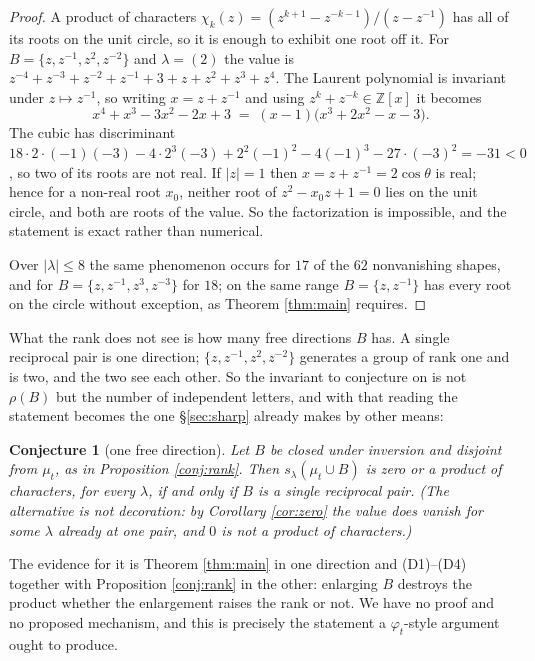 \documentclass[11pt,reqno]{amsart}
\theoremstyle{plain}
\newtheorem{conjecture}[theorem]{Conjecture}
\theoremstyle{definition}
\newcommand{\ZZ}{\mathbb{Z}}
\newcommand{\zt}{\mu_t}
\begin{document}
\begin{proof}
A product of characters $\chi_k(z)=(z^{k+1}-z^{-k-1})/(z-z^{-1})$ has all of its roots on the unit
circle, so it is enough to exhibit one root off it. For $B=\{z,z^{-1},z^{2},z^{-2}\}$ and
$\lambda=(2)$ the value is
$z^{-4}+z^{-3}+z^{-2}+z^{-1}+3+z+z^{2}+z^{3}+z^{4}$. The Laurent polynomial is invariant under
$z\mapsto z^{-1}$, so writing $x=z+z^{-1}$ and using $z^{k}+z^{-k}\in\ZZ[x]$ it becomes
\[
x^{4}+x^{3}-3x^{2}-2x+3\;=\;(x-1)\bigl(x^{3}+2x^{2}-x-3\bigr).
\]
The cubic has discriminant
$18\cdot2\cdot(-1)(-3)-4\cdot2^{3}(-3)+2^{2}(-1)^{2}-4(-1)^{3}-27\cdot(-3)^{2}=-31<0$, so two of its
roots are not real. If $|z|=1$ then $x=z+z^{-1}=2\cos\theta$ is real; hence for a non-real root
$x_0$, neither root of $z^{2}-x_0z+1=0$ lies on the unit circle, and both are roots of the value.
So the factorization is impossible, and the statement is exact rather than numerical.

Over $|\lambda|\le8$ the same phenomenon occurs for $17$ of the $62$ nonvanishing shapes, and for
$B=\{z,z^{-1},z^{3},z^{-3}\}$ for $18$; on the same range $B=\{z,z^{-1}\}$ has every root on the
circle without exception, as Theorem \ref{thm:main} requires.
\end{proof}

What the rank does not see is how many free directions $B$ has. A single reciprocal pair is one
direction; $\{z,z^{-1},z^{2},z^{-2}\}$ generates a group of rank one and is two, and the two see each
other. So the invariant to conjecture on is not $\rho(B)$ but the number of independent letters,
and with that reading the statement becomes the one \S\ref{sec:sharp} already makes by other means:

\begin{conjecture}[one free direction]\label{conj:rank2}
Let $B$ be closed under inversion and disjoint from $\zt$, as in Proposition \ref{conj:rank}. Then
$s_\lambda(\zt\cup B)$ is zero or a product of characters, for every $\lambda$, if and only if $B$ is
a single reciprocal pair. (The alternative is not decoration: by Corollary \ref{cor:zero} the value
does vanish for some $\lambda$ already at one pair, and $0$ is not a product of characters.)
\end{conjecture}

The evidence for it is Theorem \ref{thm:main} in one direction and (D1)--(D4) together with
Proposition \ref{conj:rank} in the other: enlarging $B$ destroys the product whether the enlargement
raises the rank or not. We have no proof and no proposed mechanism, and this is precisely the
statement a $\varphi_t$-style argument ought to produce.
\end{document}
